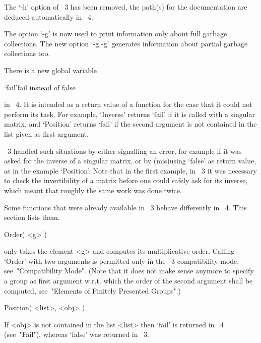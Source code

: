 The `-h' option of {\GAP}~3 has been removed,
the path(s) for the documentation are deduced automatically in {\GAP}~4.

The option `-g' is now used to print information only about full garbage
collections.
The new option `-g -g' generates  information about partial
garbage collections too.



There is a new global variable

\>`fail'{fail instead of false}

in {\GAP}~4.
It is intended as a return value of a function for the case that it
could not perform its task.
For example, `Inverse' returns `fail' if it is called with a singular
matrix, and `Position' returns `fail' if the second argument is not
contained in the list given as first argument.

{\GAP}~3 handled such situations by either signalling an error,
for example if it was asked for the inverse of a singular matrix,
or by (mis)using `false' as return value, as in the example `Position'.
Note that in the first example, in {\GAP}~3 it was necessary to check
the invertibility of a matrix before one could safely ask for its
inverse, which meant that roughly the same work was done twice.



Some functions that were already available in {\GAP}~3  behave
differently in {\GAP}~4.  This section lists them.

% 

\>Order( <g> )

only takes the element <g> and computes its multiplicative order.
Calling `Order' with two arguments is permitted only in the
{\GAP}~3 compatibility mode, see~"Compatibility Mode".
(Note that it does not make sense anymore to specify a group as
first argument w.r.t. which the order of the second argument shall
be computed, see~"Elements of Finitely Presented Groups".)

\>Position( <list>, <obj> )

If <obj> is not contained in the list <list> then `fail' is returned
in {\GAP}~4 (see~"Fail"), whereas `false' was returned in {\GAP}~3.

